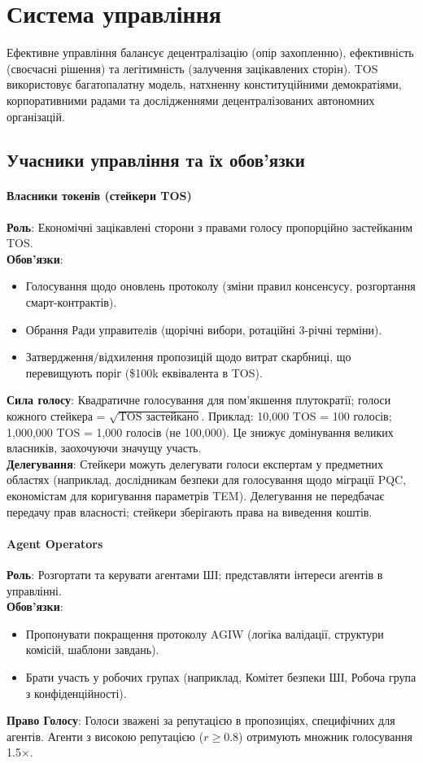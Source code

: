 \documentclass[11pt]{article}
\begin{document}
\section{Система управління}
\label{sec:governance}

Ефективне управління балансує децентралізацію (опір захопленню), ефективність (своєчасні рішення) та легітимність (залучення зацікавлених сторін). TOS використовує багатопалатну модель, натхненну конституційними демократіями, корпоративними радами та дослідженнями децентралізованих автономних організацій.

\subsection{Учасники управління та їх обов'язки}

\paragraph{Власники токенів (стейкери TOS)}
\textbf{Роль}: Економічні зацікавлені сторони з правами голосу пропорційно застейканим TOS.\\
\textbf{Обов'язки}:
\begin{itemize}[noitemsep]
  \item Голосування щодо оновлень протоколу (зміни правил консенсусу, розгортання смарт-контрактів).
  \item Обрання Ради управителів (щорічні вибори, ротаційні 3-річні терміни).
  \item Затвердження/відхилення пропозицій щодо витрат скарбниці, що перевищують поріг (\$100k еквівалента в TOS).
\end{itemize}
\textbf{Сила голосу}: Квадратичне голосування для пом'якшення плутократії; голоси кожного стейкера = $\sqrt{\text{TOS застейкано}}$. Приклад: 10,000 TOS = 100 голосів; 1,000,000 TOS = 1,000 голосів (не 100,000). Це знижує домінування великих власників, заохочуючи значущу участь.\\
\textbf{Делегування}: Стейкери можуть делегувати голоси експертам у предметних областях (наприклад, дослідникам безпеки для голосування щодо міграції PQC, економістам для коригування параметрів TEM). Делегування не передбачає передачу прав власності; стейкери зберігають права на виведення коштів.

\paragraph{Agent Operators}
\textbf{Роль}: Розгортати та керувати агентами ШІ; представляти інтереси агентів в управлінні.\\
\textbf{Обов'язки}:
\begin{itemize}[noitemsep]
  \item Пропонувати покращення протоколу AGIW (логіка валідації, структури комісій, шаблони завдань).
  \item Брати участь у робочих групах (наприклад, Комітет безпеки ШІ, Робоча група з конфіденційності).
\end{itemize}
\textbf{Право Голосу}: Голоси зважені за репутацією в пропозиціях, специфічних для агентів. Агенти з високою репутацією ($r \geq 0.8$) отримують множник голосування 1.5$\times$.
\end{document}
